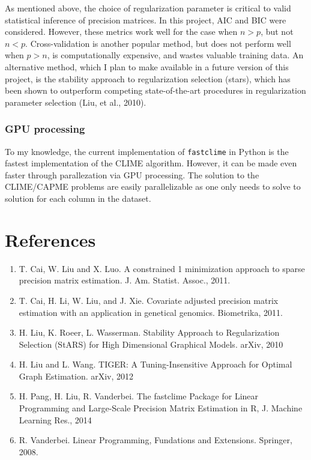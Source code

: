 \documentclass{article}
\begin{document}
As mentioned above, the choice of regularization parameter is critical
to valid statistical inference of precision matrices. In this project,
AIC and BIC were considered. However, these metrics work well for the
case when $n > p$, but not $n < p$. Cross-validation is another popular
method, but does not perform well when $p > n$, is computationally
expensive, and wastes valuable training data. An alternative method,
which I plan to make available in a future version of this project, is
the stability approach to regularization selection (stars), which has
been shown to outperform competing state-of-the-art procedures in
regularization parameter selection (Liu, et al., 2010).

\subsubsection{GPU processing}\label{gpu-processing}

To my knowledge, the current implementation of \texttt{fastclime} in
Python is the fastest implementation of the CLIME algorithm. However, it
can be made even faster through parallezation via GPU processing. The
solution to the CLIME/CAPME problems are easily parallelizable as one
only needs to solve to solution for each column in the dataset.

    \section{References}\label{references}

    \begin{enumerate}
\def\labelenumi{\arabic{enumi}.}
\item
  T. Cai, W. Liu and X. Luo. A constrained 1 minimization approach to
  sparse precision matrix estimation. J. Am. Statist. Assoc., 2011.
\item
  T. Cai, H. Li, W. Liu, and J. Xie. Covariate adjusted precision matrix
  estimation with an application in genetical genomics. Biometrika,
  2011.
\item
  H. Liu, K. Roeer, L. Wasserman. Stability Approach to Regularization
  Selection (StARS) for High Dimensional Graphical Models. arXiv, 2010
\item
  H. Liu and L. Wang. TIGER: A Tuning-Insensitive Approach for Optimal
  Graph Estimation. arXiv, 2012
\item
  H. Pang, H. Liu, R. Vanderbei. The fastclime Package for Linear
  Programming and Large-Scale Precision Matrix Estimation in R, J.
  Machine Learning Res., 2014
\item
  R. Vanderbei. Linear Programming, Fundations and Extensions. Springer,
  2008.
\end{enumerate}


    
    
    
    
\end{document}
